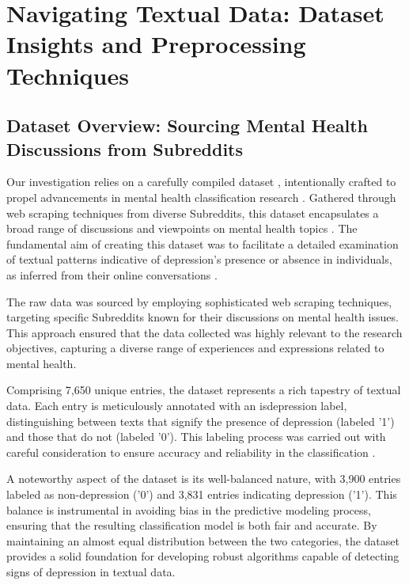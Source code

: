 \chapter{Navigating Textual Data: Dataset Insights and Preprocessing Techniques}
\label{chap:ch1}

\par
\section{Dataset Overview: Sourcing Mental Health Discussions from Subreddits}

\quad Our investigation relies on a carefully compiled dataset \cite{depressionDataset}, intentionally crafted to propel advancements in mental health classification research . Gathered through web scraping techniques from diverse Subreddits, this dataset encapsulates a broad range of discussions and viewpoints on mental health topics . The fundamental aim of creating this dataset was to facilitate a detailed examination of textual patterns indicative of depression's presence or absence in individuals, as inferred from their online conversations .

The raw data was sourced by employing sophisticated web scraping techniques, targeting specific Subreddits known for their discussions on mental health issues. This approach ensured that the data collected was highly relevant to the research objectives, capturing a diverse range of experiences and expressions related to mental health.

Comprising 7,650 unique entries, the dataset represents a rich tapestry of textual data. Each entry is meticulously annotated with an is\textunderscore depression label, distinguishing between texts that signify the presence of depression (labeled '1') and those that do not (labeled '0'). This labeling process was carried out with careful consideration to ensure accuracy and reliability in the classification \cite{depressionDataset}.

A noteworthy aspect of the dataset is its well-balanced nature, with 3,900 entries labeled as non-depression ('0') and 3,831 entries indicating depression ('1'). This balance is instrumental in avoiding bias in the predictive modeling process, ensuring that the resulting classification model is both fair and accurate. By maintaining an almost equal distribution between the two categories, the dataset provides a solid foundation for developing robust algorithms capable of detecting signs of depression in textual data.

